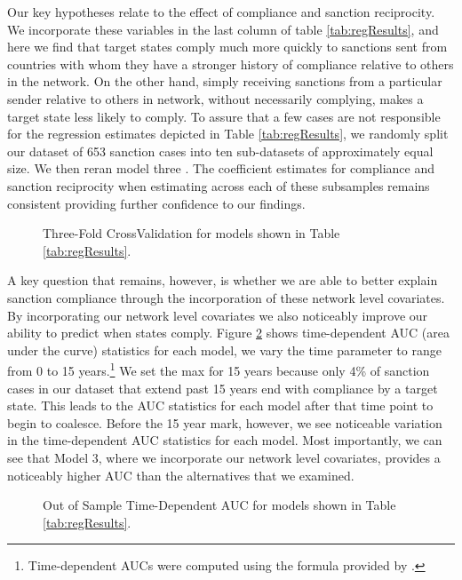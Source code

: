 Our key hypotheses relate to the effect of compliance and sanction reciprocity. We incorporate these variables in the last column of table \ref{tab:regResults}, and here we find that target states comply much more quickly to sanctions sent from countries with whom they have a stronger history of compliance relative to others in the network. On the other hand, simply receiving sanctions from a particular sender relative to others in network, without necessarily complying, makes a target state less likely to comply. To assure that a few cases are not responsible for the regression estimates depicted in Table \ref{tab:regResults}, we randomly split our dataset of 653 sanction cases into ten sub-datasets of approximately equal size. We then reran model three . The coefficient estimates for compliance and sanction reciprocity when estimating across each of these subsamples remains consistent providing further confidence to our findings.

\begin{figure}[ht]
	\centering
	\caption{Three-Fold CrossValidation for models shown in Table \ref{tab:regResults}.}
	\resizebox{0.8\textwidth}{!}{}
	\label{fig:crossval}
\end{figure}
\FloatBarrier

A key question that remains, however, is whether we are able to better explain sanction compliance through the incorporation of these network level covariates. By incorporating our network level covariates we also noticeably improve our ability to predict when states comply. Figure \ref{fig:auc} shows time-dependent AUC (area under the curve) statistics for each model, we vary the time parameter to range from 0 to 15 years.\footnote{Time-dependent AUCs were computed using the formula provided by \citet{chambless2006estimation}.} We set the max for 15 years because only 4\% of sanction cases in our dataset that extend past 15 years end with compliance by a target state. This leads to the AUC statistics for each model after that time point to begin to coalesce. Before the 15 year mark, however, we see noticeable variation in the time-dependent AUC statistics for each model. Most importantly, we can see that Model 3, where we incorporate our network level covariates, provides a noticeably higher AUC than the alternatives that we examined.

\begin{figure}[ht]
	\centering
	\caption{Out of Sample Time-Dependent AUC for models shown in Table \ref{tab:regResults}.}
	\resizebox{0.8\textwidth}{!}{}
	\label{fig:auc}
\end{figure}
\FloatBarrier

